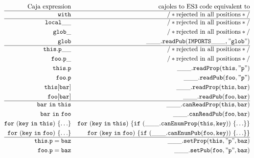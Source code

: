 \documentclass[letterpaper,twocolumn,10pt]{article}
\newcommand{\code}[1]{{\tt {#1}}}              %
\begin{document}
\begin{figure}
\begin{eqnarray}
  \mathrm{Caja\ expression} & \nonumber                 & \mathrm{cajoles\ to\ ES3\ code\ equivalent\ to} \\
  \hline
  \code{with}               & \label{with:bad}          & \mathrm{/*rejected\ in\ all\ positions*/} \\
  \hline
  \code{local\_\_}          & \label{var:bad-suffix}    & \mathrm{/*rejected\ in\ all\ positions*/} \\
  \code{glob\_}             & \label{var:bad-global-suffix} & \mathrm{/*rejected\ in\ all\ positions*/} \\
  \code{glob}               & \label{var:global}        & \code{\_\_\_.readPub(IMPORTS\_\_\_,"glob")} \\
  \hline
  \code{this.p\_\_}         & \label{read:bad-suffix}   & \mathrm{/*rejected\ in\ all\ positions*/} \\
  \code{foo.p\_}            & \label{read:bad-internal} & \mathrm{/*rejected\ in\ all\ positions*/} \\
  \code{this.p}             & \label{read:internal}     & \code{\_\_\_.readProp(this,"p")} \\
  \code{foo.p}              & \label{read:public}       & \code{\_\_\_.readPub(foo,"p")} \\
  \code{this[bar]}          & \label{read:index-internal} & \code{\_\_\_.readProp(this,bar)} \\
  \code{foo[bar]}           & \label{read:index-public} & \code{\_\_\_.readPub(foo,bar)} \\
  \hline
  \code{bar\ in\ this}      & \label{in:internal}       & \code{\_\_\_.canReadProp(this,bar)} \\
  \code{bar\ in\ foo}       & \label{in:public}         & \code{\_\_\_.canReadPub(foo,bar)} \\
  \code{for\ (key\ in\ this)\ \{\ldots\}} & \label{for:internal}
                                 & \code{for\ (key\ in\ this)\ \{if\ (\_\_\_.canEnumProp(this,key))\ \{\ldots\}\}}\\
  \code{for\ (key\ in\ foo)\ \{\ldots\}}  & \label{for:public}
                                 & \code{for\ (key\ in\ foo)\ \{if\ (\_\_\_.canEnumPub(foo,key))\ \{\ldots\}\}} \\
  \hline
  \code{this.p = baz}       & \label{set:internal}      & \code{\_\_\_.setProp(this,"p",baz)} \\
  \code{foo.p = baz}        & \label{set:public}        & \code{\_\_\_.setPub(foo,"p",baz)} \\

\end{eqnarray}
\end{figure}
\end{document}
